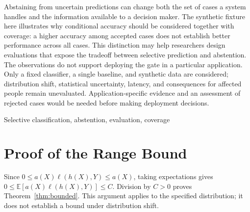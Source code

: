 \documentclass[journal]{IEEEtai}
\title{\LongTitle}
\author{Anonymous submission}
\begin{document}
\maketitle
\begin{abstract}
We examine a fixed confidence gate for selective classification using a synthetic
evaluation fixture. The gate abstains from predictions below a specified confidence
threshold. We report accuracy among accepted predictions alongside coverage on two
synthetic datasets. Conditional accuracy increases on one dataset and decreases on
the other; these observations do not establish an overall accuracy improvement.
A range bound for selective risk requires positive coverage and bounded loss.
Statistical uncertainty, runtime, and distribution shift remain unevaluated.
\end{abstract}
\begin{IEEEImpStatement}
Abstaining from uncertain predictions can change both the set of cases a system
handles and the information available to a decision maker. The synthetic fixture
here illustrates why conditional accuracy should be considered together with
coverage: a higher accuracy among accepted cases does not establish better
performance across all cases. This distinction may help researchers design
evaluations that expose the tradeoff between selective prediction and abstention.
The observations do not support deploying the gate in a particular application.
Only a fixed classifier, a single baseline, and synthetic data are considered;
distribution shift, statistical uncertainty, latency, and consequences for affected
people remain unevaluated. Application-specific evidence and an assessment of
rejected cases would be needed before making deployment decisions.
\end{IEEEImpStatement}
\begin{IEEEkeywords}Selective classification, abstention, evaluation, coverage\end{IEEEkeywords}


\appendix
\section{Proof of the Range Bound}\label{app:proof}
Since $0\leq a(X)\ell(h(X),Y)\leq a(X)$, taking expectations gives
$0\leq\mathbb{E}[a(X)\ell(h(X),Y)]\leq C$. Division by $C>0$ proves
Theorem~\ref{thm:bounded}. This argument applies to the specified distribution;
it does not establish a bound under distribution shift.
\end{document}
